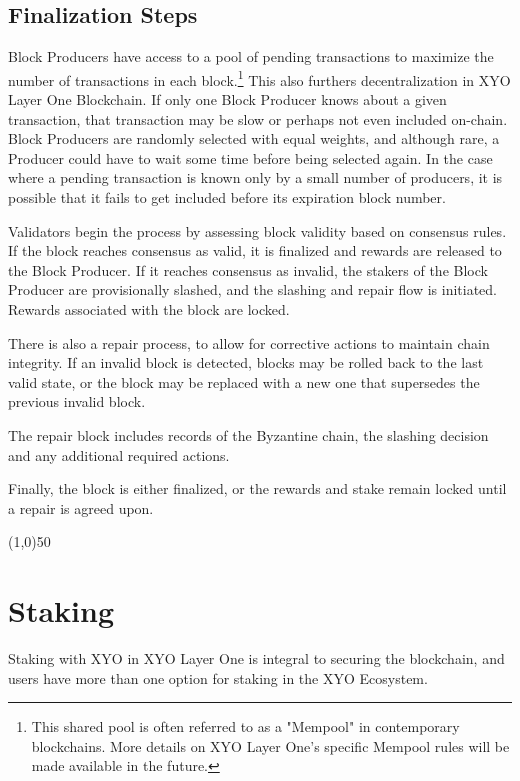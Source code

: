 \documentclass{article}
\begin{document}
\subsection{Finalization Steps}
Block Producers have access to a pool of pending transactions to maximize the number of transactions in each block.\footnote{This shared pool is often referred to as a "Mempool" in contemporary blockchains. More details on XYO Layer One's specific Mempool rules will be made available in the future.} This also furthers decentralization in XYO Layer One Blockchain. If only one Block Producer knows about a given transaction, that transaction may be slow or perhaps not even included on-chain. Block Producers are randomly selected with equal weights, and although rare, a Producer could have to wait some time before being selected again. In the case where a pending transaction is known only by a small number of producers, it is possible that it fails to get included before its expiration block number.

Validators begin the process by assessing block validity based on consensus rules. If the block reaches consensus as valid, it is finalized and rewards are released to the Block Producer. If it reaches consensus as invalid, the stakers of the Block Producer are provisionally slashed, and the slashing and repair flow is initiated. Rewards associated with the block are locked.

There is also a repair process, to allow for corrective actions to maintain chain integrity. If an invalid block is detected, blocks may be rolled back to the last valid state, or the block may be replaced with a new one that supersedes the previous invalid block.

The repair block includes records of the Byzantine chain, the slashing decision and any additional required actions.

Finally, the block is either finalized, or the rewards and stake remain locked until a repair is agreed upon.

\begin{center}
\line(1,0){50}
\end{center}


\section{Staking}
Staking with XYO in XYO Layer One is integral to securing the blockchain, and users have more than one option for staking in the XYO Ecosystem. 
\end{document}
